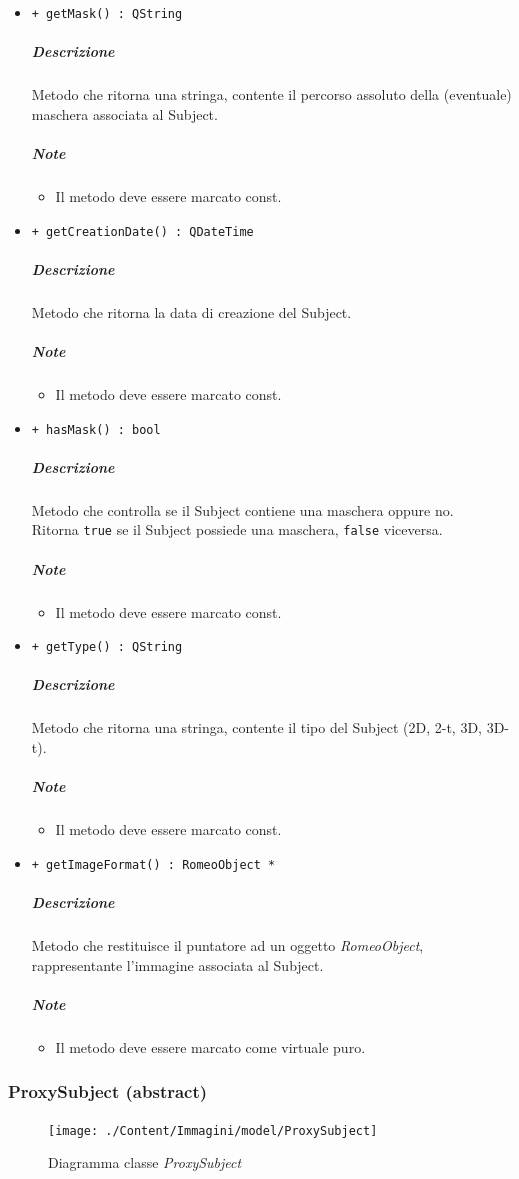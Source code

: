 \begin{itemize}
\begin{itemize}
			\end{itemize}
			\item \color{blue} \verb!+ getMask() : QString!
			\color{black}
			\subparagraph{Descrizione} Metodo che ritorna una stringa, contente il percorso assoluto della (eventuale) maschera associata al Subject\g{}.
			\subparagraph{Note}
			\begin{itemize}
				\item Il metodo deve essere marcato const.
			\end{itemize}
			\item \color{blue} \verb!+ getCreationDate() : QDateTime!
			\color{black}
			\subparagraph{Descrizione} Metodo che ritorna la data di creazione del Subject\g{}.
			\subparagraph{Note}
			\begin{itemize}
				\item Il metodo deve essere marcato const.
			\end{itemize}
			\item \color{blue} \verb!+ hasMask() : bool!
			\color{black}
			\subparagraph{Descrizione} Metodo che controlla se il Subject\g{} contiene una maschera\g{} oppure no.
\\Ritorna \verb!true! se il Subject\g{} possiede una maschera, \verb!false! viceversa.
			\subparagraph{Note}
			\begin{itemize}
				\item Il metodo deve essere marcato const.
			\end{itemize}
			\item \color{blue} \verb!+ getType() : QString!
			\color{black}
			\subparagraph{Descrizione} Metodo che ritorna una stringa, contente il tipo del Subject\g{} (2D, 2-t, 3D, 3D-t).
			\subparagraph{Note}
			\begin{itemize}
				\item Il metodo deve essere marcato const.
			\end{itemize}
			\item \color{blue} \verb!+ getImageFormat() : RomeoObject *!
			\color{black}
			\subparagraph{Descrizione} Metodo che restituisce il puntatore ad un oggetto \textsl{RomeoObject}, rappresentante l'immagine associata al Subject\g{}.
			\subparagraph{Note}
			\begin{itemize}
				\item Il metodo deve essere marcato come virtuale puro.
			\end{itemize}
		\end{itemize}
	\subsubsection{ProxySubject (abstract)}
	\begin{figure}[!h]
		\centering
		\texttt{[image: ./Content/Immagini/model/ProxySubject]}
		\caption{Diagramma classe \textsl{ProxySubject}}
	\end{figure}

